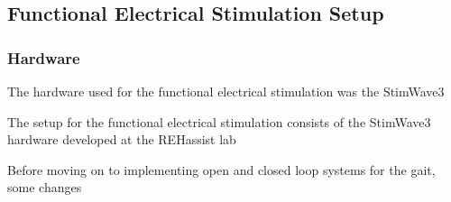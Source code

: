 \subsection{Functional Electrical Stimulation Setup}

\subsubsection{Hardware}
The hardware used for the functional electrical stimulation was the StimWave3


The setup for the functional electrical stimulation consists of the StimWave3 hardware developed at the REHassist lab 


Before moving on to implementing open and closed loop systems for the gait, some changes 



